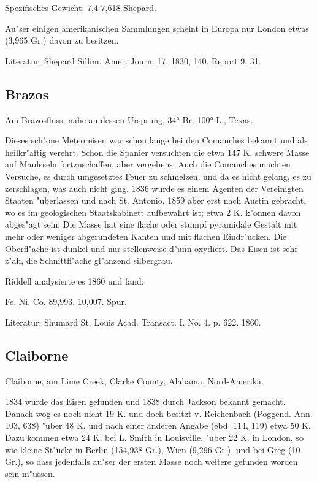 \documentclass[a4paper, 11pt, oneside]{article}
\begin{document}
Spezifisches Gewicht: 7,4-7,618 Shepard.

Au"ser einigen amerikanischen Sammlungen scheint in Europa nur London etwas (3,965 Gr.) davon zu besitzen.

Literatur: Shepard Sillim. Amer. Journ. 17, 1830, 140. Report 9, 31.

\subsection{Brazos}

Am Brazosfluss, nahe an dessen Ursprung, 34° Br. 100° L., Texas.

Dieses sch"one Meteoreisen war schon lange bei den Comanches bekannt und als heilkr"aftig verehrt. Schon die Spanier versuchten die etwa 147 K. schwere Masse auf Mauleseln fortzuschaffen, aber vergebens. Auch die Comanches machten Versuche, es durch umgesetztes Feuer zu schmelzen, und da es nicht gelang, es zu zerschlagen, was auch nicht ging. 1836 wurde es einem Agenten der Vereinigten Staaten "uberlassen und nach St. Antonio, 1859 aber erst nach Austin gebracht, wo es im geologischen Staatskabinett aufbewahrt ist; etwa 2 K. k"onnen davon abges"agt sein. Die Masse hat eine flache oder stumpf pyramidale Gestalt mit mehr oder weniger abgerundeten Kanten und mit flachen Eindr"ucken. Die Oberfl"ache ist dunkel und nur stellenweise d"unn oxydiert. Das Eisen ist sehr z"ah, die Schnittfl"ache gl"anzend silbergrau.

Riddell analysierte es 1860 und fand:

Fe. Ni. Co.  
89,993. 10,007. Spur.

Literatur: Shumard St. Louis Acad. Transact. I. No. 4. p. 622. 1860.

\subsection{Claiborne}

Claiborne, am Lime Creek, Clarke County, Alabama, Nord-Amerika.

1834 wurde das Eisen gefunden und 1838 durch Jackson bekannt gemacht. Danach wog es noch nicht 19 K. und doch besitzt v. Reichenbach (Poggend. Ann. 103, 638) "uber 48 K. und nach einer anderen Angabe (ebd. 114, 119) etwa 50 K. Dazu kommen etwa 24 K. bei L. Smith in Louisville, "uber 22 K. in London, so wie kleine St"ucke in Berlin (154,938 Gr.), Wien (9,296 Gr.), und bei Greg (10 Gr.), so dass jedenfalls au"ser der ersten Masse noch weitere gefunden worden sein m"ussen.
\end{document}
